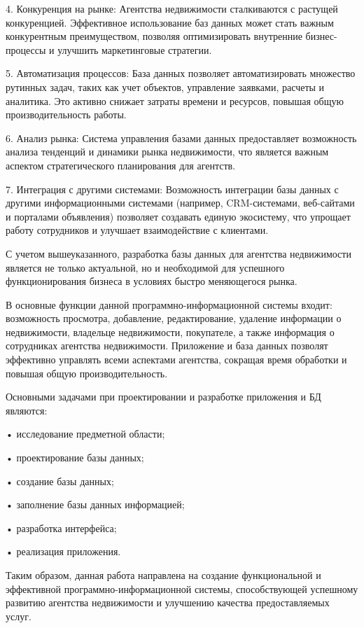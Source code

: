 4. Конкуренция на рынке: Агентства недвижимости сталкиваются с растущей конкуренцией. Эффективное использование баз данных может стать важным конкурентным преимуществом, позволяя оптимизировать внутренние бизнес-процессы и улучшить маркетинговые стратегии.

5. Автоматизация процессов: База данных позволяет автоматизировать множество рутинных задач, таких как учет объектов, управление заявками, расчеты и аналитика. Это активно снижает затраты времени и ресурсов, повышая общую производительность работы.

6. Анализ рынка: Система управления базами данных предоставляет возможность анализа тенденций и динамики рынка недвижимости, что является важным аспектом стратегического планирования для агентств.

7. Интеграция с другими системами: Возможность интеграции базы данных с другими информационными системами (например, CRM-системами, веб-сайтами и порталами объявления) позволяет создавать единую экосистему, что упрощает работу сотрудников и улучшает взаимодействие с клиентами.

С учетом вышеуказанного, разработка базы данных для агентства недвижимости является не только актуальной, но и необходимой для успешного функционирования бизнеса в условиях быстро меняющегося рынка.

В основные функции данной программно-информационной системы входит: возможность просмотра, добавление, редактирование, удаление информации о недвижимости, владельце недвижимости, покупателе, а также информация о сотрудниках агентства недвижимости. Приложение и база данных позволят эффективно управлять всеми аспектами агентства, сокращая время обработки и повышая общую производительность.

Основными задачами при проектировании и разработке приложения и БД являются:

•	исследование предметной области;

•	проектирование базы данных;

•	создание базы данных;

•	заполнение базы данных информацией;

•	разработка интерфейса;

•	реализация приложения.

Таким образом, данная работа направлена на создание функциональной и эффективной программно-информационной системы, способствующей успешному развитию агентства недвижимости и улучшению качества предоставляемых услуг.


